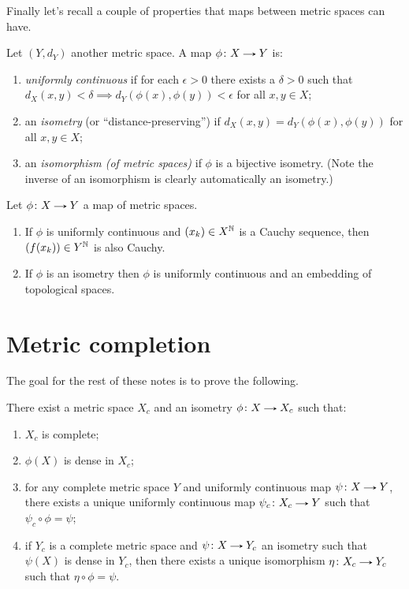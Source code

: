 Finally let's recall a couple of properties that maps between metric
spaces can have.

\begin{definition}
  Let $(Y, d_Y)$ another metric space. A map $\phi \c X \to Y$ is:
  \begin{enumerate}
  \item \textit{uniformly continuous} if for each $\epsilon > 0$ there
    exists a $\delta > 0$ such that $d_X(x,y) < \delta \implies
    d_Y(\phi(x),\phi(y)) < \epsilon$ for all $x,y \in X$;
  \item an \textit{isometry} (or ``distance-preserving'') if $d_X(x,y)
    = d_Y(\phi(x),\phi(y))$ for all $x,y \in X$;
  \item an \textit{isomorphism (of metric spaces)} if $\phi$ is a
    bijective isometry. (Note the inverse of an isomorphism is clearly
    automatically an isometry.)
  \end{enumerate}
\end{definition}

\begin{exercise}
  \label{maps}
  Let $\phi \c X \to Y$ a map of metric spaces.
  \begin{enumerate}
  \item If $\phi$ is uniformly continuous and $(x_k) \in X^{\mathbb{N}}$ is a
    Cauchy sequence, then $(f(x_k)) \in Y^{\mathbb{N}}$ is also Cauchy.
  \item If $\phi$ is an isometry then $\phi$ is uniformly continuous
    and an embedding of topological spaces.
  \end{enumerate}
\end{exercise}


\section{Metric completion}

The goal for the rest of these notes is to prove the following.

\begin{proposition}
  \label{completion}
  There exist a metric space $X_c$ and an isometry $\phi \c X \to X_c$
  such that:
  \begin{enumerate}
  \item $X_c$ is complete;
  \item $\phi(X)$ is dense in $X_c$;
  \item for any complete metric space $Y$ and uniformly continuous map
    $\psi \c X \to Y$, there exists a unique uniformly continuous map
    $\psi_c \c X_c \to Y$ such that $\psi_c \circ \phi = \psi$;
  \item if $Y_c$ is a complete metric space and $\psi \c X \to Y_c$ an
    isometry such that $\psi(X)$ is dense in $Y_c$, then there exists
    a unique isomorphism $\eta \c X_c \to Y_c$ such that $\eta \circ
    \phi = \psi$.
  \end{enumerate}
\end{proposition}

